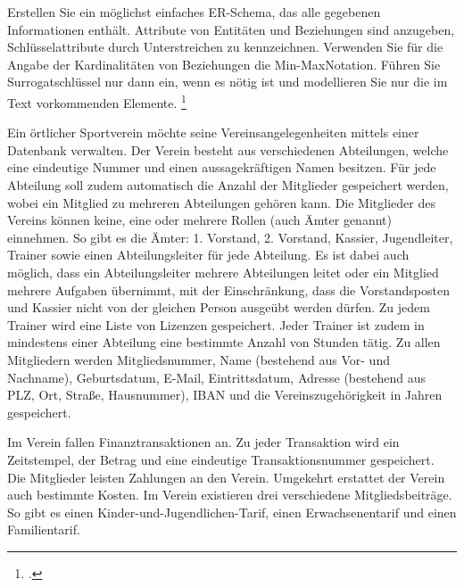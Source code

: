 \documentclass{bschlangaul-aufgabe}
\begin{document}

Erstellen Sie ein möglichst einfaches ER-Schema, das alle gegebenen
Informationen enthält. Attribute von Entitäten und Beziehungen sind
anzugeben, Schlüsselattribute durch Unterstreichen zu kennzeichnen.
Verwenden Sie für die Angabe der Kardinalitäten von Beziehungen die
Min-MaxNotation. Führen Sie Surrogatschlüssel nur dann ein, wenn es
nötig ist und modellieren Sie nur die im Text vorkommenden Elemente.
\footcite{examen:66116:2019:09}

Ein örtlicher Sportverein möchte seine Vereinsangelegenheiten mittels
einer Datenbank verwalten. Der Verein besteht aus verschiedenen
Abteilungen, welche eine eindeutige Nummer und einen aussagekräftigen
Namen besitzen. Für jede Abteilung soll zudem automatisch die Anzahl der
Mitglieder gespeichert werden, wobei ein Mitglied zu mehreren
Abteilungen gehören kann. Die Mitglieder des Vereins können keine, eine
oder mehrere Rollen (auch Ämter genannt) einnehmen. So gibt es die
Ämter: 1. Vorstand, 2. Vorstand, Kassier, Jugendleiter, Trainer sowie
einen Abteilungsleiter für jede Abteilung. Es ist dabei auch möglich,
dass ein Abteilungsleiter mehrere Abteilungen leitet oder ein Mitglied
mehrere Aufgaben übernimmt, mit der Einschränkung, dass die
Vorstandsposten und Kassier nicht von der gleichen Person ausgeübt
werden dürfen. Zu jedem Trainer wird eine Liste von Lizenzen
gespeichert. Jeder Trainer ist zudem in mindestens einer Abteilung eine
bestimmte Anzahl von Stunden tätig. Zu allen Mitgliedern werden
Mitgliedsnummer, Name (bestehend aus Vor- und Nachname), Geburtsdatum,
E-Mail, Eintrittsdatum, Adresse (bestehend aus PLZ, Ort, Straße,
Hausnummer), IBAN und die Vereinszugehörigkeit in Jahren gespeichert.

Im Verein fallen Finanztransaktionen an. Zu jeder Transaktion wird ein
Zeitstempel, der Betrag und eine eindeutige Transaktionsnummer
gespeichert. Die Mitglieder leisten Zahlungen an den Verein. Umgekehrt
erstattet der Verein auch bestimmte Kosten. Im Verein existieren drei
verschiedene Mitgliedsbeiträge. So gibt es einen
Kinder-und-Jugendlichen-Tarif, einen Erwachsenentarif und einen
Familientarif.
\end{document}
